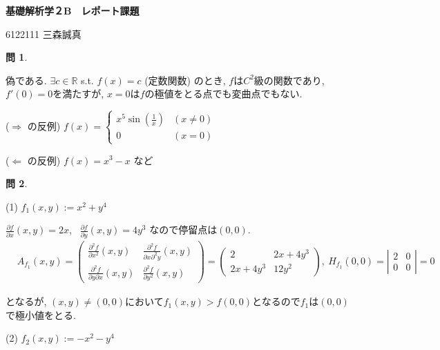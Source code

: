 \documentclass{jsarticle}
\newtheorem{question}{問}
\begin{document}
\textbf{基礎解析学２B　レポート課題}
\begin{flushright}
6122111 三森誠真
\end{flushright}
\begin{question}
\end{question}
偽である. $\exists c\in\mathbb{R}$ s.t. $f(x)=c$ (定数関数) のとき, $f$は$C^2$級の関数であり, $f'(0) = 0$を満たすが, $x=0$は$f$の極値をとる点でも変曲点でもない.

($\Longrightarrow$ の反例)
$f(x) = 
\begin{cases}
 x^5 \sin(\frac{1}{x}) & (x \neq 0) \\
 0 & (x = 0)
\end{cases}$

($\Longleftarrow$ の反例)
$f(x) = x^3 - x$ など

\bigskip

\begin{question}
\end{question}
(1)
$f_1 (x,y) := x^2+y^4$

\bigskip

$\displaystyle\frac{\partial f}{\partial x}(x, y) = 2x$, \ 
$\displaystyle\frac{\partial f}{\partial y}(x, y) = 4y^3$ なので停留点は$(0,0)$.
$$
\begin{aligned}
& A_{f_1}(x, y)=\left(\begin{array}{cc}
\displaystyle\frac{\partial^2 f}{\partial x^2}(x, y) & \displaystyle\frac{\partial^2 f}{\partial x \partial^2 y}(x, y) \\
\displaystyle\frac{\partial^2 f}{\partial y \partial x}(x, y) & \displaystyle\frac{\partial^2 f}{\partial y^2}(x, y)
\end{array}\right)=\left(\begin{array}{cc}
2 & 2 x+4 y^3 \\
2 x+4 y^3 & 12 y^2
\end{array}\right) , \ H_{f_1}(0,0)=\left|\begin{array}{ll}
2 & 0 \\
0 & 0
\end{array}\right|=0
\end{aligned}
$$

となるが, $(x,y) \neq (0,0)$において$f_1(x,y)>f(0,0)$となるので$f_1$は$(0,0)$で極小値をとる.

\bigskip
\bigskip
\bigskip

(2)
$f_2 (x,y) := -x^2-y^4$

\bigskip
\end{document}
